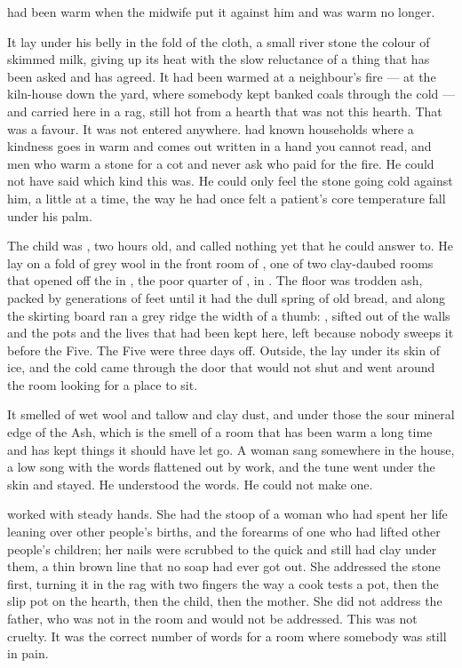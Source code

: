 
 had been warm when the midwife put it against him and was warm no longer.

It lay under his belly in the fold of the cloth, a small river stone the colour of skimmed milk, giving up its heat with the slow reluctance of a thing that has been asked and has agreed. It had been warmed at a neighbour's fire --- at the kiln-house down the yard, where somebody kept banked coals through the cold --- and carried here in a rag, still hot from a hearth that was not this hearth. That was a favour. It was not entered anywhere.  had known households where a kindness goes in warm and comes out written in a hand you cannot read, and men who warm a stone for a cot and never ask who paid for the fire. He could not have said which kind this was. He could only feel the stone going cold against him, a little at a time, the way he had once felt a patient's core temperature fall under his palm.

The child was , two hours old, and called nothing yet that he could answer to. He lay on a fold of grey wool in the front room of , one of two clay-daubed rooms that opened off the  in , the poor quarter of , in . The floor was trodden ash, packed by generations of feet until it had the dull spring of old bread, and along the skirting board ran a grey ridge the width of a thumb: , sifted out of the walls and the pots and the lives that had been kept here, left because nobody sweeps it before the Five. The Five were three days off. Outside, the  lay under its skin of ice, and the cold came through the door that would not shut and went around the room looking for a place to sit.

It smelled of wet wool and tallow and clay dust, and under those the sour mineral edge of the Ash, which is the smell of a room that has been warm a long time and has kept things it should have let go. A woman sang somewhere in the house, a low song with the words flattened out by work, and the tune went under the skin and stayed. He understood the words. He could not make one.

 worked with steady hands. She had the stoop of a woman who had spent her life leaning over other people's births, and the forearms of one who had lifted other people's children; her nails were scrubbed to the quick and still had clay under them, a thin brown line that no soap had ever got out. She addressed the stone first, turning it in the rag with two fingers the way a cook tests a pot, then the slip pot on the hearth, then the child, then the mother. She did not address the father, who was not in the room and would not be addressed. This was not cruelty. It was the correct number of words for a room where somebody was still in pain.

